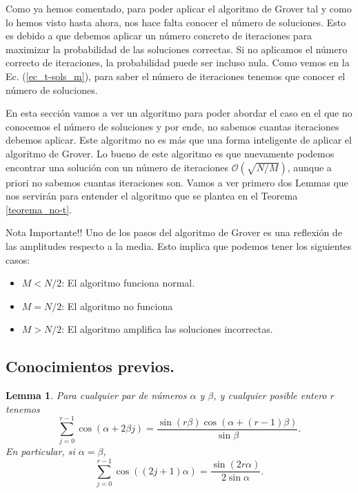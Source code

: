 \documentclass[a4paper,11pt]{book} %
\newtheorem{lemma_contador}{Lemma}
\newcommand{\Lemma}[1]{
		\begin{mybox_gray2}{}
			\begin{lemma_contador}
				 #1 
			\end{lemma_contador} 
		\end{mybox_gray2}
	}
\numberwithin{equation}{chapter}
\def\lp{\left(}
\def\rp{\right)}
\begin{document}
Como ya hemos comentado, para poder aplicar el algoritmo de Grover tal y como lo hemos visto hasta ahora, nos hace falta conocer el número de soluciones. Esto es debido a que debemos aplicar un número concreto de iteraciones para maximizar la probabilidad de las soluciones correctas. Si no aplicamos el número correcto de iteraciones, la probabilidad puede ser incluso nula. Como vemos en la Ec. (\ref{ec_t-sols_m}), para saber el número de iteraciones tenemos que conocer el número de soluciones. 

En esta sección vamos a ver un algoritmo para poder abordar el caso en el que no conocemos el número de soluciones y por ende, no sabemos cuantas iteraciones debemos aplicar. Este algoritmo no es más que una forma inteligente de aplicar el algoritmo de Grover. Lo bueno de este algoritmo es que nuevamente podemos encontrar una solución con un número de iteraciones $\mathcal{O}( \sqrt{N/M} )$, aunque a priori no sabemos cuantas iteraciones son. Vamos a ver primero dos Lemmas que nos servirán para entender el algoritmo que se plantea en el Teorema \ref{teorema_no-t}.

	\begin{mybox_blue}{Nota Importante!!}
	Uno de los pasos del algoritmo de Grover es una reflexión de las amplitudes respecto a la media. 
	Esto implica que podemos tener los siguientes casos:
	\begin{itemize}
		\item $M < N/2$: El algoritmo funciona normal.
		
		\item $M = N/2$: El algoritmo no funciona
		
		\item $M > N/2$: El algoritmo amplifica las soluciones incorrectas.
	\end{itemize}
	\end{mybox_blue}


\subsection{Conocimientos previos.}

	\Lemma{ \label{lemma_suma_cos}
Para cualquier par de números $\alpha$ y $\beta$, y cualquier posible entero $r$ tenemos
\begin{equation}
\sum_{j=0}^{r-1} \cos \lp \alpha + 2 \beta j \rp = \frac{\sin \lp r \beta \rp \cos (\alpha + (r-1) \beta)}{\sin \beta}.
\end{equation}
En particular, si $\alpha = \beta$,
\begin{equation}
\sum^{r-1}_{j=0} \cos \lp \lp 2 j + 1 \rp \alpha \rp = \frac{\sin \lp 2 r \alpha \rp}{2 \sin \alpha}.
\end{equation}
}
\end{document}
